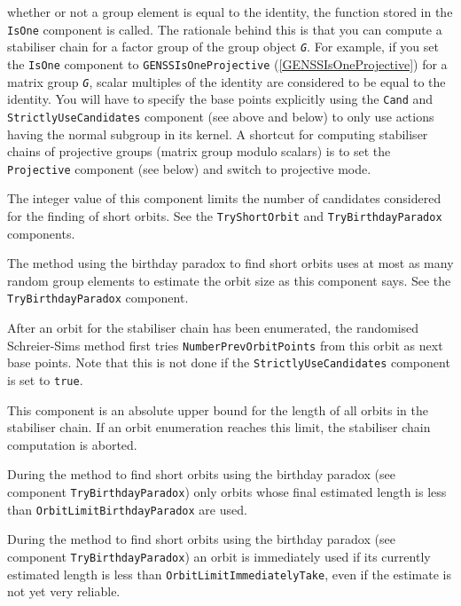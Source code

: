 \documentclass[a4paper,11pt]{report}
\begin{document}
{{\begin{description}
whether or not a group element is equal to the identity, the function stored
in the \texttt{IsOne} component is called. The rationale behind this is that you can compute a
stabiliser chain for a factor group of the group object \mbox{\texttt{\mdseries\slshape G}}. For example, if you set the \texttt{IsOne} component to \texttt{GENSS{\textunderscore}IsOneProjective} (\ref{GENSSIsOneProjective}) for a matrix group \mbox{\texttt{\mdseries\slshape G}}, scalar multiples of the identity are considered to be equal to the identity.
You will have to specify the base points explicitly using the \texttt{Cand} and \texttt{StrictlyUseCandidates} component (see above and below) to only use actions having the normal subgroup
in its kernel. A shortcut for computing stabiliser chains of projective groups
(matrix group modulo scalars) is to set the \texttt{Projective} component (see below) and switch to projective mode. 
\item[{\texttt{LimitShortOrbCandidates}}]  The integer value of this component limits the number of candidates considered
for the finding of short orbits. See the \texttt{TryShortOrbit} and \texttt{TryBirthdayParadox} components. 
\item[{\texttt{NrRandElsBirthdayParadox}}]  The method using the birthday paradox to find short orbits uses at most as
many random group elements to estimate the orbit size as this component says.
See the \texttt{TryBirthdayParadox} component. 
\item[{\texttt{NumberPrevOrbitPoints}}]  After an orbit for the stabiliser chain has been enumerated, the randomised
Schreier-Sims method first tries \texttt{NumberPrevOrbitPoints} from this orbit as next base points. Note that this is not done if the \texttt{StrictlyUseCandidates} component is set to \texttt{true}. 
\item[{\texttt{OrbitLengthLimit}}] This component is an absolute upper bound for the length of all orbits in the
stabiliser chain. If an orbit enumeration reaches this limit, the stabiliser
chain computation is aborted. 
\item[{\texttt{OrbitLimitBirthdayParadox}}]  During the method to find short orbits using the birthday paradox (see
component \texttt{TryBirthdayParadox}) only orbits whose final estimated length is less than \texttt{OrbitLimitBirthdayParadox} are used. 
\item[{\texttt{OrbitLimitImmediatelyTake}}]  During the method to find short orbits using the birthday paradox (see
component \texttt{TryBirthdayParadox}) an orbit is immediately used if its currently estimated length is less than \texttt{OrbitLimitImmediatelyTake}, even if the estimate is not yet very reliable. 

\end{description}}}
\end{document}
